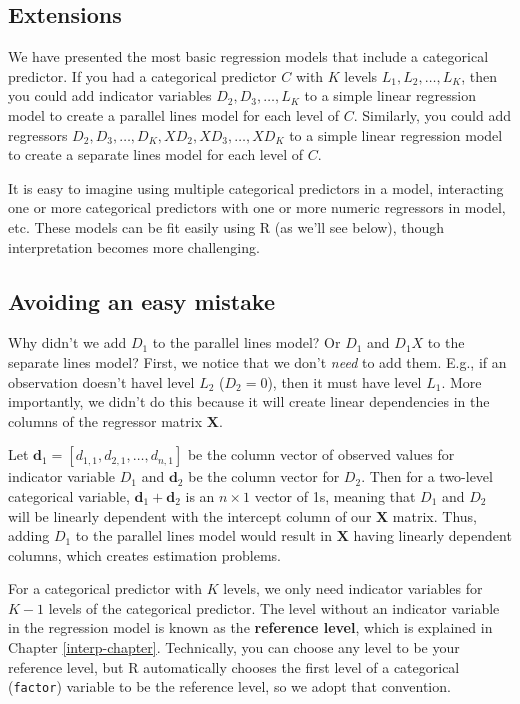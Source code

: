 \documentclass[
]{book}
\theoremstyle{definition}
\theoremstyle{definition}
\theoremstyle{definition}
\theoremstyle{definition}
\theoremstyle{remark}
\begin{document}
\hypertarget{extensions}{%
\subsection{Extensions}\label{extensions}}

We have presented the most basic regression models that include a categorical predictor. If you had a categorical predictor \(C\) with \(K\) levels \(L_1, L_2, \ldots, L_K\), then you could add indicator variables \(D_2, D_3, \ldots, L_K\) to a simple linear regression model to create a parallel lines model for each level of \(C\). Similarly, you could add regressors \(D_2, D_3, \ldots, D_K, X D_2, X D_3, \ldots, X D_K\) to a simple linear regression model to create a separate lines model for each level of \(C\).

It is easy to imagine using multiple categorical predictors in a model, interacting one or more categorical predictors with one or more numeric regressors in model, etc. These models can be fit easily using R (as we'll see below), though interpretation becomes more challenging.

\hypertarget{avoiding-an-easy-mistake}{%
\subsection{Avoiding an easy mistake}\label{avoiding-an-easy-mistake}}

Why didn't we add \(D_1\) to the parallel lines model? Or \(D_1\) and \(D_1 X\) to the separate lines model? First, we notice that we don't \emph{need} to add them. E.g., if an observation doesn't havel level \(L_2\) (\(D_2=0\)), then it must have level \(L_1\). More importantly, we didn't do this because it will create linear dependencies in the columns of the regressor matrix \(\mathbf{X}\).

Let \(\mathbf{d}_1=[d_{1,1}, d_{2,1}, \ldots, d_{n,1}]\) be the column vector of observed values for indicator variable \(D_1\) and \(\mathbf{d}_2\) be the column vector for \(D_2\). Then for a two-level categorical variable, \(\mathbf{d}_1 + \mathbf{d}_2\) is an \(n\times 1\) vector of 1s, meaning that \(D_1\) and \(D_2\) will be linearly dependent with the intercept column of our \(\mathbf{X}\) matrix. Thus, adding \(D_1\) to the parallel lines model would result in \(\mathbf{X}\) having linearly dependent columns, which creates estimation problems.

For a categorical predictor with \(K\) levels, we only need indicator variables for \(K-1\) levels of the categorical predictor. The level without an indicator variable in the regression model is known as the \textbf{reference level}, which is explained in Chapter \ref{interp-chapter}. Technically, you can choose any level to be your reference level, but R automatically chooses the first level of a categorical (\texttt{factor}) variable to be the reference level, so we adopt that convention.
\end{document}
